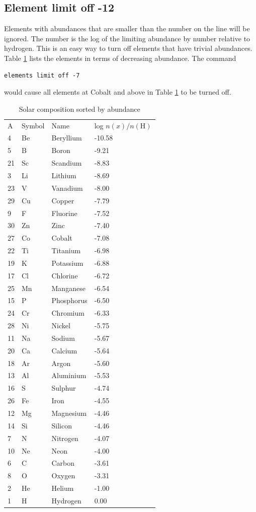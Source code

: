 \subsection{Element limit off -12}

\noindent Elements with abundances that are
smaller than the number on the line will be ignored.
The number is the log of the limiting abundance by number relative to
hydrogen.
This is an easy way to turn off elements that have trivial
abundances.
Table \ref{tab:CompositionDecreasingOrder} lists the elements
in terms of decreasing abundance.
The command
\begin{verbatim}
elements limit off -7
\end{verbatim}
would cause all elements at Cobalt and above in
Table \ref{tab:CompositionDecreasingOrder} to be turned off.

\begin{table}
\centering
\caption{Solar composition sorted by abundance}
\begin{tabular}{llll}
\hline
\label{tab:CompositionDecreasingOrder}
A& Symbol& Name& log $n(x)/n(\mathrm{H})$\\
4& Be& Beryllium& -10.58\\
5& B& Boron& -9.21\\
21& Sc& Scandium& -8.83\\
3& Li& Lithium& -8.69\\
23& V& Vanadium& -8.00\\
29& Cu& Copper& -7.79\\
9& F& Fluorine& -7.52\\
30& Zn& Zinc& -7.40\\
27& Co& Cobalt& -7.08\\
22& Ti& Titanium& -6.98\\
19& K& Potassium& -6.88\\
17& Cl& Chlorine& -6.72\\
25& Mn& Manganese& -6.54\\
15& P& Phosphorus& -6.50\\
24& Cr& Chromium& -6.33\\
28& Ni& Nickel& -5.75\\
11& Na& Sodium& -5.67\\
20& Ca& Calcium& -5.64\\
18& Ar& Argon& -5.60\\
13& Al& Aluminium& -5.53\\
16& S& Sulphur& -4.74\\
26& Fe& Iron& -4.55\\
12& Mg& Magnesium& -4.46\\
14& Si& Silicon& -4.46\\
7& N& Nitrogen& -4.07\\
10& Ne& Neon& -4.00\\
6& C& Carbon& -3.61\\
8& O& Oxygen& -3.31\\
2& He& Helium& -1.00\\
1& H& Hydrogen& 0.00\\
\hline
\end{tabular}
\end{table}

